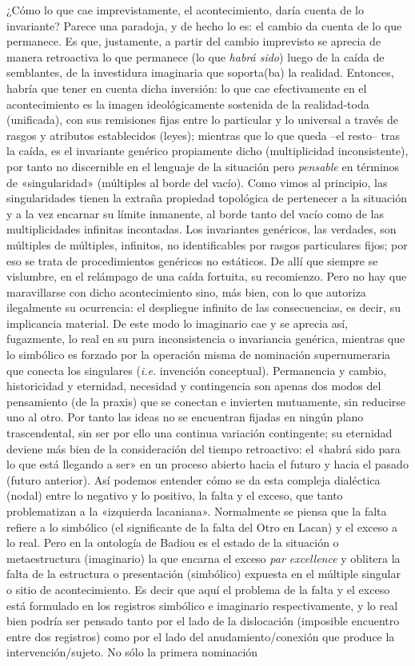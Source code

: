 ¿Cómo lo que cae imprevistamente, el acontecimiento, daría cuenta de lo invariante? Parece una paradoja, y de hecho lo es: el cambio da cuenta de lo que permanece. Es que, justamente, a partir del cambio imprevisto se aprecia de manera retroactiva lo que permanece (lo que \emph{habrá sido}) luego de la caída de semblantes, de la investidura imaginaria que soporta(ba) la realidad. Entonces, habría que tener en cuenta dicha inversión: lo que cae efectivamente en el acontecimiento es la imagen ideológicamente sostenida de la realidad-toda (unificada), con sus remisiones fijas entre lo particular y lo universal a través de rasgos y atributos establecidos (leyes); mientras que lo que queda --el resto-- tras la caída, es el invariante genérico propiamente dicho (multiplicidad inconsistente), por tanto no discernible en el lenguaje de la situación pero \emph{pensable} en términos de «singularidad» (múltiples al borde del vacío). Como vimos al principio, las singularidades tienen la extraña propiedad topológica de pertenecer a la situación y a la vez encarnar su límite inmanente, al borde tanto del vacío como de las multiplicidades infinitas incontadas. Los invariantes genéricos, las verdades, son múltiples de múltiples, infinitos, no identificables por rasgos particulares fijos; por eso se trata de procedimientos genéricos no estáticos. De allí que siempre se vislumbre, en el relámpago de una caída fortuita, su recomienzo. Pero no hay que maravillarse con dicho acontecimiento sino, más bien, con lo que autoriza ilegalmente su ocurrencia: el despliegue infinito de las consecuencias, es decir, su implicancia material. De este modo lo imaginario cae y se aprecia así, fugazmente, lo real en su pura inconsistencia o invariancia genérica, mientras que lo simbólico es forzado por la operación misma de nominación supernumeraria que conecta los singulares (\emph{i.e.} invención conceptual). Permanencia y cambio, historicidad y eternidad, necesidad y contingencia son apenas dos modos del pensamiento (de la praxis) que se conectan e invierten mutuamente, sin reducirse uno al otro. Por tanto las ideas no se encuentran fijadas en ningún plano trascendental, sin ser por ello una continua variación contingente; su eternidad deviene más bien de la consideración del tiempo retroactivo: el «habrá sido para lo que está llegando a ser» en un proceso abierto hacia el futuro y hacia el pasado (futuro anterior). Así podemos entender cómo se da esta compleja dialéctica (nodal) entre lo negativo y lo positivo, la falta y el exceso, que tanto problematizan a la «izquierda lacaniana». Normalmente se piensa que la falta refiere a lo simbólico (el significante de la falta del Otro en Lacan) y el exceso a lo real. Pero en la ontología de Badiou es el estado de la situación o metaestructura (imaginario) la que encarna el exceso \emph{par excellence} y oblitera la falta de la estructura o presentación (simbólico) expuesta en el múltiple singular o sitio de acontecimiento. Es decir que aquí el problema de la falta y el exceso está formulado en los registros simbólico e imaginario respectivamente, y lo real bien podría ser pensado tanto por el lado de la dislocación (imposible encuentro entre dos registros) como por el lado del anudamiento/conexión que produce la intervención/sujeto. No sólo la primera nominación 